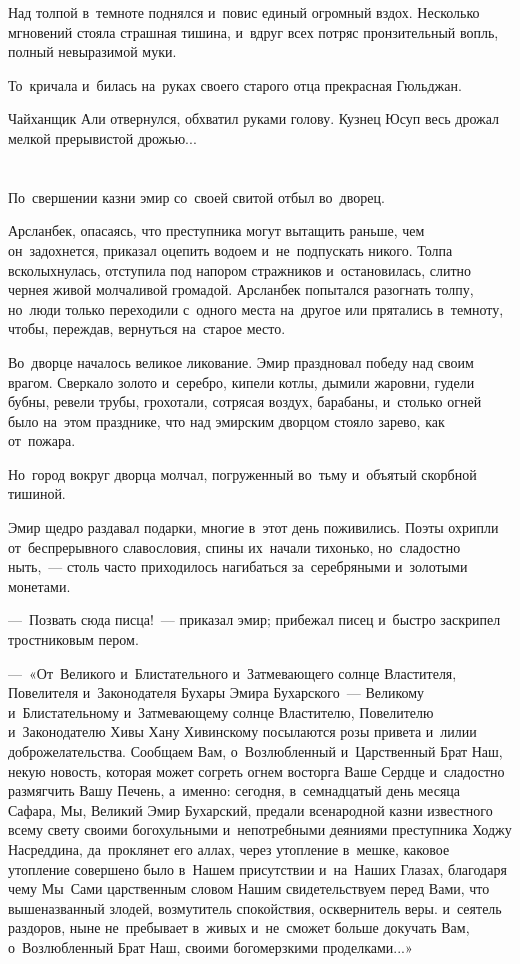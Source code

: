\documentclass[12pt,a4paper]{book}
\begin{document}
Над толпой в~темноте поднялся и~повис единый огромный вздох. Несколько мгновений стояла страшная тишина, и~вдруг всех потряс пронзительный вопль, полный невыразимой муки.

То~кричала и~билась на~руках своего старого отца прекрасная Гюльджан.

Чайханщик Али отвернулся, обхватил руками голову. Кузнец Юсуп весь дрожал мелкой прерывистой дрожью...


\chapter{}

По~свершении казни эмир со~своей свитой отбыл во~дворец.

Арсланбек, опасаясь, что преступника могут вытащить раньше, чем он~задохнется, приказал оцепить водоем и~не~подпускать никого. Толпа всколыхнулась, отступила под напором стражников и~остановилась, слитно чернея живой молчаливой громадой. Арсланбек попытался разогнать толпу, но~люди только переходили с~одного места на~другое или прятались в~темноту, чтобы, переждав, вернуться на~старое место.

Во~дворце началось великое ликование. Эмир праздновал победу над своим врагом. Сверкало золото и~серебро, кипели котлы, дымили жаровни, гудели бубны, ревели трубы, грохотали, сотрясая воздух, барабаны, и~столько огней было на~этом празднике, что над эмирским дворцом стояло зарево, как от~пожара.

Но~город вокруг дворца молчал, погруженный во~тьму и~объятый скорбной тишиной.

Эмир щедро раздавал подарки, многие в~этот день поживились. Поэты охрипли от~беспрерывного славословия, спины их~начали тихонько, но~сладостно ныть,~— столь часто приходилось нагибаться за~серебряными и~золотыми монетами.

—~Позвать сюда писца!~— приказал эмир; прибежал писец и~быстро заскрипел тростниковым пером.

—~«От~Великого и~Блистательного и~Затмевающего солнце Властителя, Повелителя и~Законодателя Бухары Эмира Бухарского~— Великому и~Блистательному и~Затмевающему солнце Властителю, Повелителю и~Законодателю Хивы Хану Хивинскому посылаются розы привета и~лилии доброжелательства. Сообщаем Вам, о~Возлюбленный и~Царственный Брат Наш, некую новость, которая может согреть огнем восторга Ваше Сердце и~сладостно размягчить Вашу Печень, а~именно: сегодня, в~семнадцатый день месяца Сафара, Мы, Великий Эмир Бухарский, предали всенародной казни известного всему свету своими богохульными и~непотребными деяниями преступника Ходжу Насреддина, да~проклянет его аллах, через утопление в~мешке, каковое утопление совершено было в~Нашем присутствии и~на~Наших Глазах, благодаря чему Мы~Сами царственным словом Нашим свидетельствуем перед Вами, что вышеназванный злодей, возмутитель спокойствия, осквернитель веры. и~сеятель раздоров, ныне не~пребывает в~живых и~не~сможет больше докучать Вам, о~Возлюбленный Брат Наш, своими богомерзкими проделками...»
\end{document}
